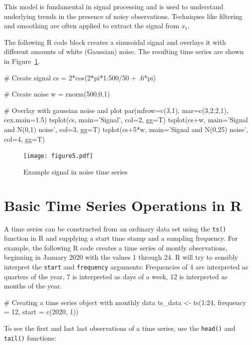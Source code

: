 This model is fundamental in signal processing and is used to understand underlying trends in the presence of noisy observations. Techniques like filtering and smoothing are often applied to extract the signal from $x_t$.

The following R code block creates a sinusoidal signal and overlays it with different amounts of white (Gaussian) noise. The resulting time series are shown in Figure~\ref{fig:figure5}.

\begin{Rcode}
# Create signal
cs = 2*cos(2*pi*1:500/50 + .6*pi)

# Create noise
w = rnorm(500,0,1)

# Overlay with gaussian noise and plot
par(mfrow=c(3,1), mar=c(3,2,2,1), cex.main=1.5)
tsplot(cs, main='Signal', col=2, gg=T)
tsplot(cs+w, main='Signal and N(0,1) noise', col=3, gg=T)
tsplot(cs+5*w, main='Signal and N(0,25) noise', col=4, gg=T)
\end{Rcode}

\begin{figure}
\centering
\texttt{[image: figure5.pdf]}
\caption{Example signal in noise time series}
\label{fig:figure5}
\end{figure}

\section{Basic Time Series Operations in R}

A time series can be constructed from an ordinary data set using the \texttt{ts()} function in R and supplying a start time stamp and a sampling frequency. For example, the following R code creates a time series of montly observations, beginning in January 2020 with the values 1 through 24. R will try to sensibly interpret the \texttt{start} and \texttt{frequency} arguments: Frequencies of 4 are interpreted as quarters of the year, 7 is interpreted as days of a week, 12 is interpreted as months of the year.

\begin{samepage}
\begin{Rcode}
# Creating a time series object with monthly data
ts_data <- ts(1:24, frequency = 12, start = c(2020, 1))
\end{Rcode}
\end{samepage}

\noindent To see the first and last last observations of a time series, use the \texttt{head()} and \texttt{tail()} functions:

